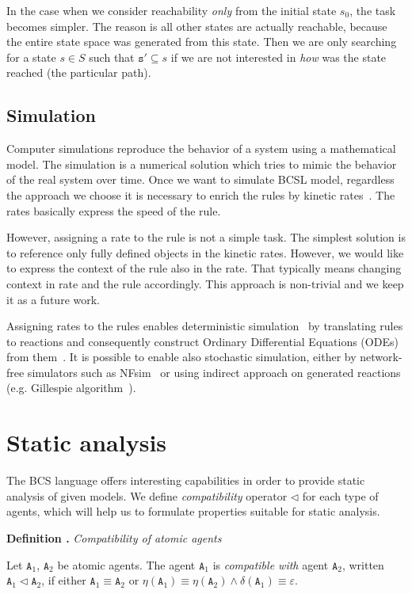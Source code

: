 \documentclass[12pt]{fithesis2}
\newcounter{counter}[section]
\renewcommand{\thecounter}{\thesection.\arabic{counter}}
\newenvironment{definition}[1]{\bigskip\refstepcounter{counter}\noindent\textbf{Definition \thecounter } \emph{#1} \par\nopagebreak \begin{itshape}}{\end{itshape}\bigskip}
\begin{document}
In the case when we consider reachability \emph{only} from the initial state $s_0$, the task becomes simpler. The reason is all other states are actually reachable, because the entire state space was generated from this state. Then we are only searching for a state $s \in S$ such that $\mathtt{s}' \subseteq s$ if we are not interested in \emph{how} was the state reached (the particular path).

\subsection{Simulation}
\label{simulation}

Computer simulations reproduce the behavior of a system using a mathematical model. The simulation is a numerical solution which tries to mimic the behavior of the real system over time. Once we want to simulate BCSL model, regardless the approach we choose it is necessary to enrich the rules by kinetic rates~\cite{mcnaught1997compendium}. The rates basically express the speed of the rule.

However, assigning a rate to the rule is not a simple task. The simplest solution is to reference only fully defined objects in the kinetic rates. However, we would like to express the context of the rule also in the rate. That typically means changing context in rate and the rule accordingly. This approach is non-trivial and we keep it as a future work.

Assigning rates to the rules enables deterministic simulation~\cite{Poole2000} by translating rules to reactions and consequently construct Ordinary Differential Equations (ODEs) from them~\cite{higham2008modeling}. It is possible to enable also stochastic simulation, either by network-free simulators such as NFsim~\cite{sneddon2011efficient} or using indirect approach on generated reactions (e.g. Gillespie algorithm~\cite{GILLESPIE1976403}).

\section{Static analysis}
\label{static_analyses}

The BCS language offers interesting capabilities in order to provide static analysis of given models. We define \emph{compatibility} operator $\lhd$ for each type of agents, which will help us to formulate properties suitable for static analysis.

\begin{definition}{Compatibility of atomic agents}
Let $\mathtt{A}_1$, $\mathtt{A}_2$ be atomic agents. The agent $\mathtt{A}_1$ is \emph{compatible with} agent $\mathtt{A}_2$, written $\mathtt{A}_1 \lhd \mathtt{A}_2$, if either $\mathtt{A}_1 \equiv \mathtt{A}_2$ or $\eta(\mathtt{A}_1) \equiv \eta(\mathtt{A}_2) \wedge \delta(\mathtt{A}_1) \equiv \varepsilon $.
\end{definition}
\end{document}
